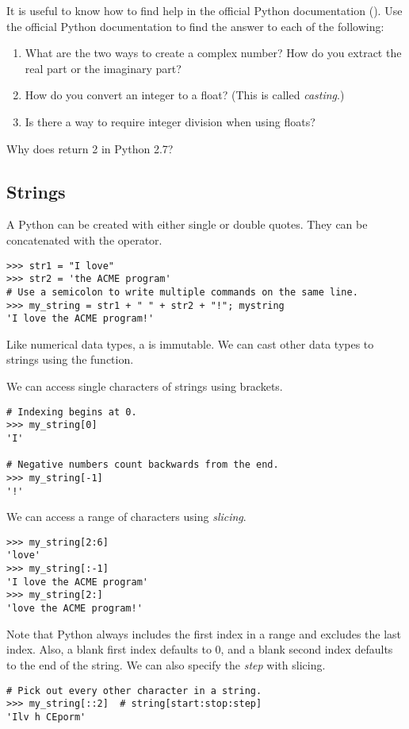 \begin{problem}
It is useful to know how to find help in the official Python documentation (). Use the official Python documentation to find the answer to each of the following:
\begin{enumerate}

\item What are the two ways to create a complex number? 
How do you extract the real part or the imaginary part?
\item How do you convert an integer to a float? (This is called \emph{casting}.)
\item Is there a way to require integer division when using floats?
\end{enumerate}
\end{problem}

\begin{problem}
Why does  return 2 in Python 2.7? 
\end{problem}

\subsection*{Strings}
\begin{example} A Python  can be created with either single or double quotes. They can be concatenated with the \li{+} operator.
\begin{lstlisting}
>>> str1 = "I love"
>>> str2 = 'the ACME program'
# Use a semicolon to write multiple commands on the same line.
>>> my_string = str1 + " " + str2 + "!"; mystring
'I love the ACME program!'
\end{lstlisting}

Like numerical data types, a  is immutable. We can cast other data types to strings using the  function.

We can access single characters of strings using brackets.

\begin{lstlisting}
# Indexing begins at 0.
>>> my_string[0]
'I'

# Negative numbers count backwards from the end.
>>> my_string[-1]
'!'
\end{lstlisting}

We can access a range of characters using \emph{slicing}.
\begin{lstlisting}
>>> my_string[2:6]
'love'
>>> my_string[:-1]
'I love the ACME program'
>>> my_string[2:]
'love the ACME program!'
\end{lstlisting}
Note that Python always includes the first index in a range and excludes the last index. Also, a blank first index defaults to 0, and a blank second index defaults to the end of the string. We can also specify the \emph{step} with slicing.
\begin{lstlisting}
# Pick out every other character in a string.
>>> my_string[::2]	# string[start:stop:step]
'Ilv h CEporm'
\end{lstlisting}
\end{example}

